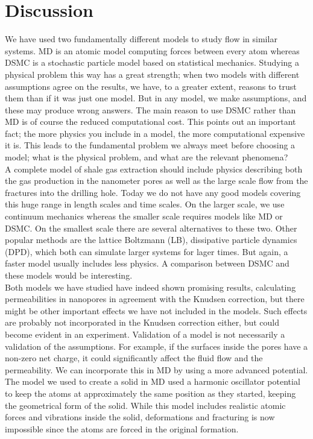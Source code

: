 \section{Discussion}
We have used two fundamentally different models to study flow in similar systems. MD is an atomic model computing forces between every atom whereas DSMC is a stochastic particle model based on statistical mechanics. Studying a physical problem this way has a great strength; when two models with different assumptions agree on the results, we have, to a greater extent, reasons to trust them than if it was just one model. But in any model, we make assumptions, and these may produce wrong answers. The main reason to use DSMC rather than MD is of course the reduced computational cost. This points out an important fact; the more physics you include in a model, the more computational expensive it is. This leads to the fundamental problem we always meet before choosing a model; what is the physical problem, and what are the relevant phenomena?\\
A complete model of shale gas extraction should include physics describing both the gas production in the nanometer pores as well as the large scale flow from the fractures into the drilling hole. Today we do not have any good models covering this huge range in length scales and time scales. On the larger scale, we use continuum mechanics whereas the smaller scale requires models like MD or DSMC. On the smallest scale there are several alternatives to these two. Other popular methods are the lattice Boltzmann (LB), dissipative particle dynamics (DPD), which both can simulate larger systems for lager times. But again, a faster model usually includes less physics. A comparison between DSMC and these models would be interesting.\\
Both models we have studied have indeed shown promising results, calculating permeabilities in nanopores in agreement with the Knudsen correction, but there might be other important effects we have not included in the models. Such effects are probably not incorporated in the Knudsen correction either, but could become evident in an experiment. Validation of a model is not necessarily a validation of the assumptions. For example, if the surfaces inside the pores have a non-zero net charge, it could significantly affect the fluid flow and the permeability. We can incorporate this in MD by using a more advanced potential. The model we used to create a solid in MD used a harmonic oscillator potential to keep the atoms at approximately the same position as they started, keeping the geometrical form of the solid. While this model includes realistic atomic forces and vibrations inside the solid, deformations and fracturing is now impossible since the atoms are forced in the original formation. \\
